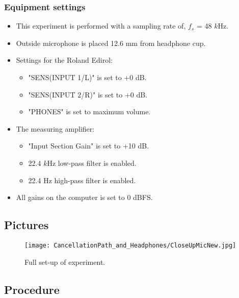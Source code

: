 \subsubsection{Equipment settings}
\begin{itemize}
	\item This experiment is performed with a sampling rate of, $f_{s}$ = 48 $k$Hz.
	\item Outside microphone is placed 12.6 mm from headphone cup. 
	\item Settings for the Roland Edirol:
	\begin{itemize}
		\item "SENS(INPUT 1/L)" is set to +0 dB.
		\item "SENS(INPUT 2/R)" is set to +0 dB.
		\item "PHONES" is set to maximum volume. %
	\end{itemize}		
	\item The measuring amplifier:
		\begin{itemize}
			\item "Input Section Gain" is set to +10 dB.
			\item 22.4 $k$Hz low-pass filter is enabled.
			\item 22.4 Hz high-pass filter is enabled.
		\end{itemize}
	\item All gains on the computer is set to 0 dBFS.
\end{itemize}

\subsection{Pictures}
\begin{figure}[H]
	\centering
	\texttt{[image: CancellationPath\_and\_Headphones/CloseUpMicNew.jpg]}
	\caption{Full set-up of experiment.}
	\label{CloseupHeadphone}
\end{figure}


\subsection{Procedure}
